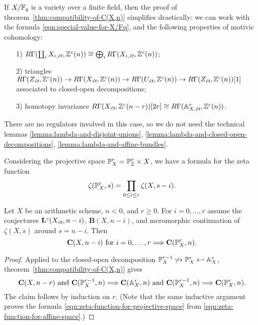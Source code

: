 \documentclass{article}
\numberwithin{equation}{section}
\begin{document}
\begin{remark}
  If $X/\FF_q$ is a variety over a finite field, then the proof of
  theorem~\ref{thm:compatibility-of-C(X,n)} simplifies drastically: we can work
  with the formula \eqref{eqn:special-value-for-X/Fq}, and the following
  properties of motivic cohomology:
  \begin{enumerate}
  \item[1)] $R\Gamma (\coprod_i X_{i,\et}, \ZZ^c (n)) \cong
    \bigoplus_i R\Gamma (X_{i,\et}, \ZZ^c (n))$;

  \item[2)] triangles
    $R\Gamma (Z_\et, \ZZ^c (n)) \to
    R\Gamma (X_\et, \ZZ^c (n)) \to
    R\Gamma (U_\et, \ZZ^c (n)) \to
    R\Gamma (Z_\et, \ZZ^c (n))[1]$
    associated to closed-open decompositions;

  \item[3)] homotopy invariance
    $R\Gamma (X_\et, \ZZ^c (n-r)) [2r] \cong
    R\Gamma (\AA^r_{X,\et}, \ZZ^c (n))$.
  \end{enumerate}
  There are no regulators involved in this case, so we do not need the technical
  lemmas
  \ref{lemma:lambda-and-disjoint-unions},
  \ref{lemma:lambda-and-closed-open-decompositions},
  \ref{lemma:lambda-and-affine-bundles}.
\end{remark}

Considering the projective space $\PP_X^r = \PP_\ZZ^r \times X$,
we have a formula for the zeta function
\begin{equation}
  \label{eqn:zeta-function-for-projective-space}
  \zeta (\PP_X^r, s) = \prod_{0 \le i \le r} \zeta (X, s-i).
\end{equation}

\begin{corollary}
  Let $X$ be an arithmetic scheme, $n < 0$, and $r \ge 0$.
  For $i = 0,\ldots,r$ assume the conjectures $\mathbf{L}^c (X_\et,n-i)$,
  $\mathbf{B} (X,n-i)$, and meromorphic continuation of $\zeta (X,s)$ around
  $s = n-i$. Then
  \[ \mathbf{C} (X,n-i)\text{ for }i = 0,\ldots,r \Longrightarrow
    \mathbf{C} (\PP_X^r, n). \]

  \begin{proof}
    Applied to the closed-open decomposition
    $\PP_X^{r-1} \not\hookrightarrow \PP_X^r \hookleftarrow \AA_X^r$,
    theorem~\ref{thm:compatibility-of-C(X,n)} gives
    \[ \mathbf{C} (X, n-r) \text{ and } \mathbf{C} (\PP_X^{r-1}, n)
      \Longrightarrow
      \mathbf{C} (\AA_X^r, n) \text{ and } \mathbf{C} (\PP_X^{r-1}, n)
      \Longrightarrow
      \mathbf{C} (\PP_X^r,n). \]
    The claim follows by induction on $r$.
    (Note that the same inductive argument proves the formula
    \eqref{eqn:zeta-function-for-projective-space} from
    \eqref{eqn:zeta-function-for-affine-space}.)
    \end{proof}
\end{corollary}
\end{document}

